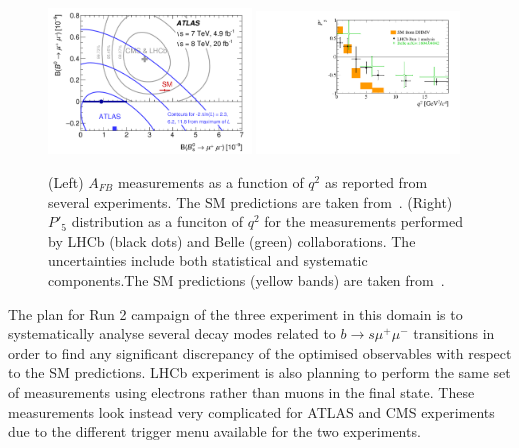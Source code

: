 \begin{figure}[!t]
  \begin{center}
  \includegraphics[width=0.48\textwidth]{fig_09.png}
  \includegraphics[width=0.48\textwidth]{P5p.pdf}
    \caption {(Left) $A_{FB}$ measurements as a function of $q^2$ as reported from several experiments. The SM predictions are taken from~\cite{ABSZ}. (Right) $P'_5$ distribution as a funciton of $q^2$ for the measurements performed by LHCb (black dots) and Belle (green) collaborations. The uncertainties include both statistical and systematic components.The SM predictions (yellow bands) are taken from~\cite{DHMV}. }
        \label{fig:mumuK}
  \end{center}
\end{figure}
The plan for Run 2 campaign of the three experiment in this domain is to systematically analyse several decay modes related to $b \to s \mu^+ \mu^-$  transitions in order to find any significant discrepancy of the optimised observables with respect to the SM predictions. LHCb experiment is also planning to perform the same set of measurements using electrons rather than muons in the final state. These measurements look instead very complicated for ATLAS and CMS experiments due to the different trigger menu available for the two experiments.


